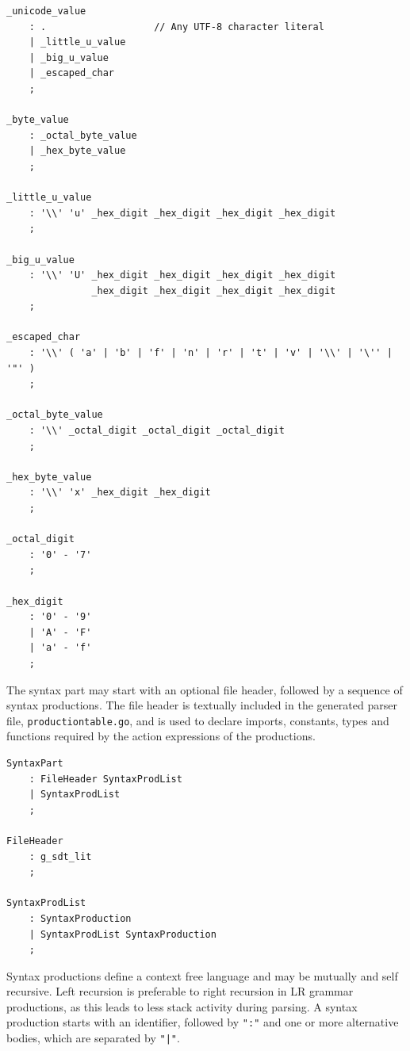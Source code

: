\documentclass[12pt]{article}
\begin{document}
\begin{Verbatim}[frame=single]
_unicode_value
    : .                   // Any UTF-8 character literal
    | _little_u_value
    | _big_u_value
    | _escaped_char
    ;

_byte_value
    : _octal_byte_value
    | _hex_byte_value
    ;

_little_u_value
    : '\\' 'u' _hex_digit _hex_digit _hex_digit _hex_digit
    ;

_big_u_value
    : '\\' 'U' _hex_digit _hex_digit _hex_digit _hex_digit
               _hex_digit _hex_digit _hex_digit _hex_digit
    ;

_escaped_char
    : '\\' ( 'a' | 'b' | 'f' | 'n' | 'r' | 't' | 'v' | '\\' | '\'' | '"' )
    ;

_octal_byte_value
    : '\\' _octal_digit _octal_digit _octal_digit
    ;

_hex_byte_value
    : '\\' 'x' _hex_digit _hex_digit
    ;

_octal_digit
    : '0' - '7'
    ;

_hex_digit
    : '0' - '9'
    | 'A' - 'F'
    | 'a' - 'f'
    ;
\end{Verbatim}

The syntax part may start with an optional file header, followed by a sequence of syntax productions. The file header is textually included in the generated parser file, \verb|productiontable.go|, and is used to declare imports, constants, types and functions required by the action expressions of the productions.

\begin{Verbatim}[frame=single]
SyntaxPart
    : FileHeader SyntaxProdList
    | SyntaxProdList
    ;

FileHeader
    : g_sdt_lit
    ;

SyntaxProdList
    : SyntaxProduction
    | SyntaxProdList SyntaxProduction
    ;
\end{Verbatim}

Syntax productions define a context free language and may be mutually and self recursive. Left recursion is preferable to right recursion in LR grammar productions, as this leads to less stack activity during parsing. A syntax production starts with an identifier, followed by \verb|":"| and one or more alternative bodies, which are separated by \verb+"|"+.
\end{document}
